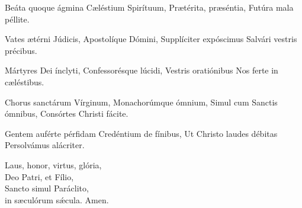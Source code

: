 Beáta quoque ágmina
Cæléstium Spirítuum,
Prætérita, præséntia,
Futúra mala péllite.

Vates ætérni Júdicis,
Apostolíque Dómini,
Supplíciter expóscimus
Salvári vestris précibus.

Mártyres Dei ínclyti,
Confessorésque lúcidi,
Vestris oratiónibus
Nos ferte in cæléstibus.

Chorus san\-ctárum Vírginum,
Monachorúmque ómnium,
Simul cum San\-ctis ómnibus,
Consórtes Christi fácite.

Gentem auférte pérfidam
Credéntium de fínibus,
Ut Christo laudes débitas
Persolvámus alácriter.

 Laus, honor, virtus, glória,\\  
    Deo Patri, et Fílio,\\  
    San\-cto simul Paráclito,\\  
    in sæculórum sǽcula. 
Amen.

